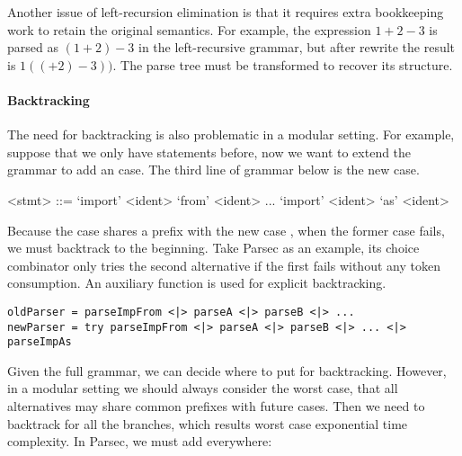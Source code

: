 Another issue of left-recursion elimination is that it requires extra
bookkeeping work to retain the original semantics. For example, the
expression $1+2-3$ is parsed as $(1+2)-3$ in the left-recursive
grammar, but after rewrite the result is $1((+2)-3))$. The parse tree
must be transformed to recover its structure.


\paragraph{Backtracking} The need for backtracking is also problematic
in a modular setting. For example, suppose that we only have  statements before, now we want to extend the grammar to add an  case. The third line of grammar below is the new case.

\setlength{\grammarindent}{5em}
\begin{grammar}
<stmt> ::= `import' <ident> `from' <ident>
    \alt ...
    \alt `import' <ident> `as' <ident>
\end{grammar}

Because the  case shares a prefix with the new case , when the former case fails, we must backtrack to the beginning. Take Parsec as an example, its choice
combinator \inlinecode{<|>} only tries the second alternative if the first fails
without any token consumption. An auxiliary function  is used for explicit backtracking.

\begin{lstlisting}[language=PlainCode]
oldParser = parseImpFrom <|> parseA <|> parseB <|> ...
newParser = try parseImpFrom <|> parseA <|> parseB <|> ... <|> parseImpAs
\end{lstlisting}

Given the full grammar, we can decide where to put  for backtracking. However, in a modular setting we should always consider the worst case, that all alternatives may share common prefixes with future cases. Then we need to backtrack for all the branches, which results worst case exponential time complexity.
In Parsec, we must add  everywhere:

